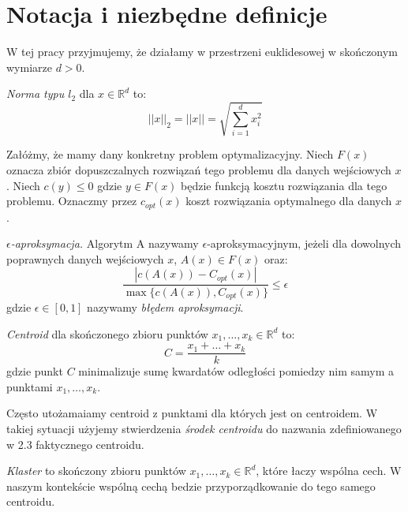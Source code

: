 \chapter{Notacja i niezbędne definicje}\label{preliminaries}

W tej pracy przyjmujemy, że działamy w przestrzeni euklidesowej w skończonym wymiarze $d > 0$.

\begin{definition}
    \emph{Norma typu $l_{2}$} dla $x \in \mathbb{R}^d$ to:
    \begin{equation}
        ||x||_{2} = ||x|| = \sqrt{ \sum_{i = 1}^{d} x_{i}^{2} }
    \end{equation}
\end{definition}

\noindent
Załóżmy, że mamy dany konkretny problem optymalizacyjny. 
Niech $F(x)$ oznacza zbiór dopuszczalnych rozwiązań tego problemu dla danych wejściowych $x$. 
Niech $c(y) \leq 0$ gdzie $ y\in F(x)$ będzie funkcją kosztu rozwiązania dla tego problemu.
Oznaczmy przez $c_{opt}(x)$ koszt rozwiązania optymalnego dla danych $x$.

\begin{definition}
    \emph{$\epsilon$-aproksymacja.} 
    Algorytm A nazywamy $\epsilon$-aproksymacyjnym, jeżeli dla dowolnych poprawnych danych wejściowych $x$, $A(x) \in F(x)$ oraz:
    \begin{equation}
        \frac{|c(A(x)) - C_{opt}(x) |}{ \max\{c(A(x)),C_{opt}(x) \} } \leq \epsilon
    \end{equation}
    gdzie $\epsilon \in [0,1]$ nazywamy \textit{błędem aproksymacji}.
\end{definition}

\begin{definition}
    \emph{Centroid} dla skończonego zbioru punktów $x_{1}, \dots, x_{k} \in \mathbb{R}^{d}$ to:
    \begin{equation}
        C = \frac{x_{1} + \dots + x_{k}}{k}
    \end{equation}
    gdzie punkt $C$ minimalizuje sumę kwardatów odległości pomiedzy nim samym a punktami $x_{1}, \dots, x_{k}$.
\end{definition}

\noindent
Często utożamaiamy centroid z punktami dla których jest on centroidem.
W takiej sytuacji użyjemy stwierdzenia \textit{środek centroidu} do nazwania zdefiniowanego w 2.3 faktycznego centroidu.

\begin{definition}
    \emph{Klaster} to skończony zbioru punktów $x_{1}, \dots, x_{k} \in \mathbb{R}^{d}$, które łaczy wspólna cech.
    W naszym kontekście wspólną cechą bedzie przyporządkowanie do tego samego centroidu.
\end{definition}

